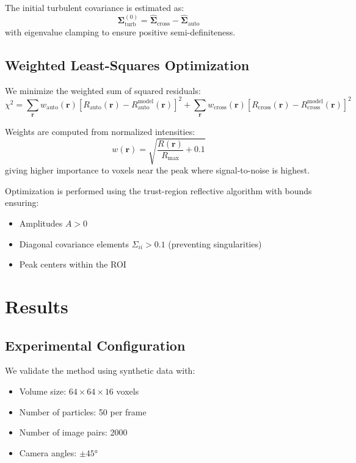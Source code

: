 \documentclass[11pt,a4paper]{article}
\begin{document}
The initial turbulent covariance is estimated as:
\begin{equation}
    \bm{\Sigma}_{\text{turb}}^{(0)} = \hat{\bm{\Sigma}}_{\text{cross}} - \hat{\bm{\Sigma}}_{\text{auto}}
\end{equation}
with eigenvalue clamping to ensure positive semi-definiteness.

\subsection{Weighted Least-Squares Optimization}

We minimize the weighted sum of squared residuals:
\begin{equation}
    \chi^2 = \sum_{\mathbf{r}} w_{\text{auto}}(\mathbf{r}) \left[R_{\text{auto}}(\mathbf{r}) - R_{\text{auto}}^{\text{model}}(\mathbf{r})\right]^2 + \sum_{\mathbf{r}} w_{\text{cross}}(\mathbf{r}) \left[R_{\text{cross}}(\mathbf{r}) - R_{\text{cross}}^{\text{model}}(\mathbf{r})\right]^2
\end{equation}

Weights are computed from normalized intensities:
\begin{equation}
    w(\mathbf{r}) = \sqrt{\frac{R(\mathbf{r})}{R_{\max}} + 0.1}
\end{equation}
giving higher importance to voxels near the peak where signal-to-noise is highest.

Optimization is performed using the trust-region reflective algorithm with bounds ensuring:
\begin{itemize}
    \item Amplitudes $A > 0$
    \item Diagonal covariance elements $\Sigma_{ii} > 0.1$ (preventing singularities)
    \item Peak centers within the ROI
\end{itemize}

\section{Results}

\subsection{Experimental Configuration}

We validate the method using synthetic data with:
\begin{itemize}
    \item Volume size: $64 \times 64 \times 16$ voxels
    \item Number of particles: 50 per frame
    \item Number of image pairs: 2000
    \item Camera angles: $\pm 45°$
\end{itemize}
\end{document}
